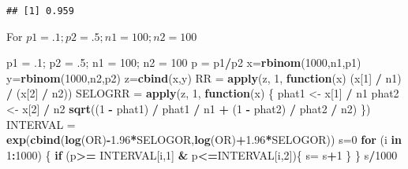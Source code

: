 \documentclass[]{article}
\newenvironment{Shaded}{\begin{snugshade}}{\end{snugshade}}
\newcommand{\KeywordTok}[1]{\textcolor[rgb]{0.13,0.29,0.53}{\textbf{#1}}}
\newcommand{\DecValTok}[1]{\textcolor[rgb]{0.00,0.00,0.81}{#1}}
\newcommand{\FloatTok}[1]{\textcolor[rgb]{0.00,0.00,0.81}{#1}}
\newcommand{\StringTok}[1]{\textcolor[rgb]{0.31,0.60,0.02}{#1}}
\newcommand{\ControlFlowTok}[1]{\textcolor[rgb]{0.13,0.29,0.53}{\textbf{#1}}}
\newcommand{\OperatorTok}[1]{\textcolor[rgb]{0.81,0.36,0.00}{\textbf{#1}}}
\newcommand{\NormalTok}[1]{#1}
\begin{document}
\begin{verbatim}
## [1] 0.959
\end{verbatim}

For \(p1 = .1; p2 = .5; n1 = 100; n2 = 100\)

\begin{Shaded}
\begin{Highlighting}[]
\NormalTok{p1 =}\StringTok{ }\NormalTok{.}\DecValTok{1}\NormalTok{; p2 =}\StringTok{ }\NormalTok{.}\DecValTok{5}\NormalTok{; n1 =}\StringTok{ }\DecValTok{100}\NormalTok{; n2 =}\StringTok{ }\DecValTok{100}
\NormalTok{p =}\StringTok{ }\NormalTok{p1}\OperatorTok{/}\NormalTok{p2}
\NormalTok{x=}\KeywordTok{rbinom}\NormalTok{(}\DecValTok{1000}\NormalTok{,n1,p1)}
\NormalTok{y=}\KeywordTok{rbinom}\NormalTok{(}\DecValTok{1000}\NormalTok{,n2,p2)}
\NormalTok{z=}\KeywordTok{cbind}\NormalTok{(x,y)}
\NormalTok{RR =}\StringTok{ }\KeywordTok{apply}\NormalTok{(z, }\DecValTok{1}\NormalTok{,}
\ControlFlowTok{function}\NormalTok{(x) (x[}\DecValTok{1}\NormalTok{] }\OperatorTok{/}\StringTok{ }\NormalTok{n1) }\OperatorTok{/}\StringTok{ }\NormalTok{(x[}\DecValTok{2}\NormalTok{] }\OperatorTok{/}\StringTok{ }\NormalTok{n2))}
\NormalTok{SELOGRR =}\StringTok{ }\KeywordTok{apply}\NormalTok{(z, }\DecValTok{1}\NormalTok{,}
\ControlFlowTok{function}\NormalTok{(x) \{}
\NormalTok{phat1 <-}\StringTok{ }\NormalTok{x[}\DecValTok{1}\NormalTok{] }\OperatorTok{/}\StringTok{ }\NormalTok{n1}
\NormalTok{phat2 <-}\StringTok{ }\NormalTok{x[}\DecValTok{2}\NormalTok{] }\OperatorTok{/}\StringTok{ }\NormalTok{n2}
\KeywordTok{sqrt}\NormalTok{((}\DecValTok{1} \OperatorTok{-}\StringTok{ }\NormalTok{phat1) }\OperatorTok{/}\StringTok{ }\NormalTok{phat1 }\OperatorTok{/}\StringTok{ }\NormalTok{n1 }\OperatorTok{+}\StringTok{ }\NormalTok{(}\DecValTok{1} \OperatorTok{-}\StringTok{ }\NormalTok{phat2) }\OperatorTok{/}\StringTok{ }\NormalTok{phat2 }\OperatorTok{/}\StringTok{ }\NormalTok{n2)}
\NormalTok{\})}
\NormalTok{INTERVAL =}\StringTok{ }\KeywordTok{exp}\NormalTok{(}\KeywordTok{cbind}\NormalTok{(}\KeywordTok{log}\NormalTok{(OR)}\OperatorTok{-}\FloatTok{1.96}\OperatorTok{*}\NormalTok{SELOGOR,}\KeywordTok{log}\NormalTok{(OR)}\OperatorTok{+}\FloatTok{1.96}\OperatorTok{*}\NormalTok{SELOGOR))}
\NormalTok{s=}\DecValTok{0}
\ControlFlowTok{for}\NormalTok{ (i }\ControlFlowTok{in} \DecValTok{1}\OperatorTok{:}\DecValTok{1000}\NormalTok{) \{}
  \ControlFlowTok{if}\NormalTok{ (p}\OperatorTok{>=}\StringTok{ }\NormalTok{INTERVAL[i,}\DecValTok{1}\NormalTok{] }\OperatorTok{&}\StringTok{ }\NormalTok{p}\OperatorTok{<=}\NormalTok{INTERVAL[i,}\DecValTok{2}\NormalTok{])\{}
\NormalTok{    s=}\StringTok{ }\NormalTok{s}\OperatorTok{+}\DecValTok{1}
\NormalTok{  \}}
\NormalTok{\}}
\NormalTok{s}\OperatorTok{/}\DecValTok{1000}
\end{Highlighting}
\end{Shaded}
\end{document}
